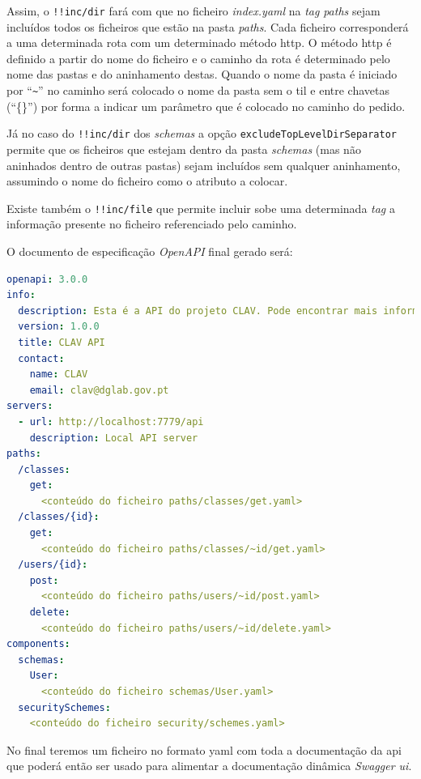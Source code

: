 Assim, o \texttt{!!inc/dir} fará com que no ficheiro \textit{index.yaml} na \textit{tag} \textit{paths} sejam 
incluídos todos os ficheiros que estão na pasta \textit{paths}. Cada ficheiro corresponderá a uma determinada 
rota com um determinado método \acrshort{http}. O método \acrshort{http} é definido a partir do nome do ficheiro 
e o caminho da rota é determinado pelo nome das pastas e do aninhamento destas. Quando o nome da pasta é iniciado 
por ``\verb|~|'' no caminho será colocado o nome da pasta sem o til e entre chavetas (``\{\}'') por forma a 
indicar um parâmetro que é colocado no caminho do pedido.

Já no caso do \texttt{!!inc/dir} dos \textit{schemas} a opção \texttt{excludeTopLevelDirSeparator} permite que 
os ficheiros que estejam dentro da pasta \textit{schemas} (mas não aninhados dentro de outras pastas) sejam 
incluídos sem qualquer aninhamento, assumindo o nome do ficheiro como o atributo a colocar.

Existe também o \texttt{!!inc/file} que permite incluir sobe uma determinada \textit{tag} a informação presente 
no ficheiro referenciado pelo caminho.

O documento de especificação \textit{OpenAPI} final gerado será:
\begin{lstlisting}[language=yaml, caption=Documento de especificação \textit{OpenAPI} gerado a partir do ficheiro \textit{index.yaml} com o uso da \textit{package} \texttt{yaml-include}, label=exem:yamlif]
openapi: 3.0.0
info:
  description: Esta é a API do projeto CLAV. Pode encontrar mais informação sobre o CLAV em [http://clav.dglab.gov.pt](http://clav.dglab.gov.pt).
  version: 1.0.0
  title: CLAV API
  contact:
    name: CLAV
    email: clav@dglab.gov.pt
servers:
  - url: http://localhost:7779/api
    description: Local API server
paths:
  /classes:
    get:
      <conteúdo do ficheiro paths/classes/get.yaml>
  /classes/{id}:
    get:
      <conteúdo do ficheiro paths/classes/~id/get.yaml>
  /users/{id}:
    post:
      <conteúdo do ficheiro paths/users/~id/post.yaml>
    delete:
      <conteúdo do ficheiro paths/users/~id/delete.yaml>
components:
  schemas:
    User:
      <conteúdo do ficheiro schemas/User.yaml>
  securitySchemes:
    <conteúdo do ficheiro security/schemes.yaml>
\end{lstlisting}

No final teremos um ficheiro no formato \acrshort{yaml} com toda a documentação da \acrshort{api} que poderá 
então ser usado para alimentar a documentação dinâmica \textit{Swagger \acrshort{ui}}.


